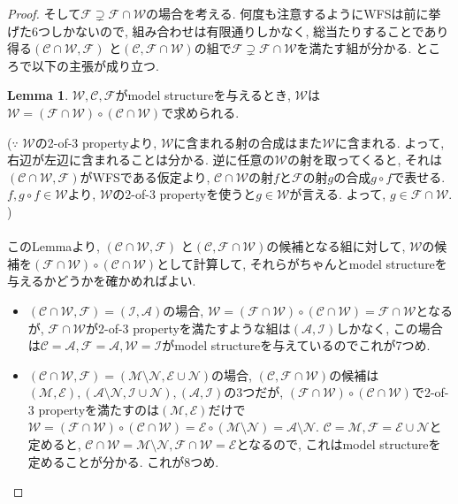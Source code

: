 \documentclass[. /main]{subfiles}
\theoremstyle{definition}
\newtheorem{lemm}[theo]{Lemma}
\begin{document}
\begin{proof}
そして$\mathcal{F} \supsetneq \mathcal{F} \cap \mathcal{W}$の場合を考える. 何度も注意するようにWFSは前に挙げた6つしかないので, 組み合わせは有限通りしかなく, 総当たりすることであり得る$(\mathcal{C} \cap \mathcal{W},  \mathcal{F})$ と$(\mathcal{C},  \mathcal{F} \cap \mathcal{W})$の組で$\mathcal{F} \supsetneq \mathcal{F} \cap \mathcal{W}$を満たす組が分かる. ところで以下の主張が成り立つ. 
\begin{lemm}
$\mathcal{W},  \mathcal{C},  \mathcal{F}$がmodel structureを与えるとき, $\mathcal{W}$は$\mathcal{W}=(\mathcal{F} \cap \mathcal{W}) \circ (\mathcal{C} \cap \mathcal{W})$で求められる. 
\end{lemm}
($\because$ $\mathcal{W}$の2-of-3 propertyより, $\mathcal{W}$に含まれる射の合成はまた$\mathcal{W}$に含まれる. よって, 右辺が左辺に含まれることは分かる. 逆に任意の$\mathcal{W}$の射を取ってくると, それは$(\mathcal{C} \cap \mathcal{W},  \mathcal{F})$がWFSである仮定より, $\mathcal{C} \cap \mathcal{W}$の射$f$と$\mathcal{F}$の射$g$の合成$g \circ f$で表せる. $f,  g \circ f \in \mathcal{W}$より, $\mathcal{W}$の2-of-3 propertyを使うと$g \in \mathcal{W}$が言える. よって, $g \in \mathcal{F} \cap \mathcal{W}$. )\\ \\
このLemmaより, $(\mathcal{C} \cap \mathcal{W},  \mathcal{F})$ と$(\mathcal{C},  \mathcal{F} \cap \mathcal{W})$の候補となる組に対して, $\mathcal{W}$の候補を$(\mathcal{F} \cap \mathcal{W}) \circ (\mathcal{C} \cap \mathcal{W})$として計算して, それらがちゃんとmodel structureを与えるかどうかを確かめればよい. 
\begin{itemize}
\item $(\mathcal{C} \cap \mathcal{W},  \mathcal{F})=(\mathcal{I},  \mathcal{A})$の場合, $\mathcal{W}=(\mathcal{F} \cap \mathcal{W}) \circ (\mathcal{C} \cap \mathcal{W})=\mathcal{F} \cap \mathcal{W}$となるが, $\mathcal{F} \cap \mathcal{W}$が2-of-3 propertyを満たすような組は$(\mathcal{A},  \mathcal{I})$しかなく, この場合は$\mathcal{C}=\mathcal{A},  \mathcal{F}=\mathcal{A},  \mathcal{W}=\mathcal{I}$がmodel structureを与えているのでこれが7つめ. 
\item $(\mathcal{C} \cap \mathcal{W},  \mathcal{F})=(\mathcal{M} \setminus \mathcal{N},  \mathcal{E} \cup \mathcal{N})$の場合, $(\mathcal{C},  \mathcal{F} \cap \mathcal{W})$の候補は$(\mathcal{M},  \mathcal{E}),  (\mathcal{A} \setminus \mathcal{N},  \mathcal{I} \cup \mathcal{N}),  (\mathcal{A},  \mathcal{I})$の3つだが, $(\mathcal{F} \cap \mathcal{W}) \circ (\mathcal{C} \cap \mathcal{W})$で2-of-3 propertyを満たすのは$(\mathcal{M},  \mathcal{E})$だけで$\mathcal{W}=(\mathcal{F} \cap \mathcal{W}) \circ (\mathcal{C} \cap \mathcal{W})=\mathcal{E} \circ (\mathcal{M} \setminus \mathcal{N})=\mathcal{A} \setminus \mathcal{N}$. $\mathcal{C}=\mathcal{M},  \mathcal{F}=\mathcal{E} \cup \mathcal{N}$と定めると, $\mathcal{C} \cap \mathcal{W}=\mathcal{M} \setminus \mathcal{N},  \mathcal{F} \cap \mathcal{W}=\mathcal{E}$となるので, これはmodel structureを定めることが分かる. これが8つめ. 

\end{itemize}
\end{proof}
\end{document}
